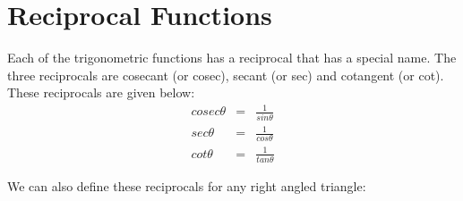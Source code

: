 \section{Reciprocal Functions}
\label{m39408*eip-466}Each of the trigonometric functions has a reciprocal that has a special name. The three reciprocals are cosecant (or cosec), secant (or sec) and cotangent (or cot). These reciprocals are given below:
\label{m39408*eid64932}\nopagebreak\noindent{}
    \begin{equation}
    \begin{array}{ccc}cosec\theta & =& \frac{1}{sin\theta }\\ sec\theta & =& \frac{1}{cos\theta }\\ cot\theta & =& \frac{1}{tan\theta }\end{array}\tag{14.10}
      \end{equation}
\par \label{m39408*eip-520}We can also define these reciprocals for any right angled triangle:
\label{m39408*eid96732}\nopagebreak\noindent{}

